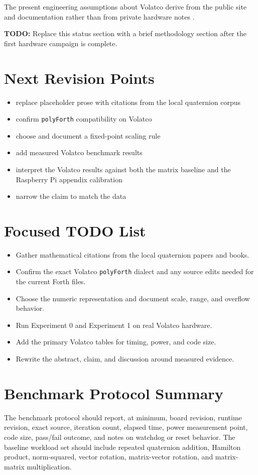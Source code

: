 \documentclass[11pt]{article}
\newcommand{\todoitem}[1]{%
  \par\noindent\textbf{TODO:} #1\par
}
\begin{document}
The present engineering assumptions about Volatco derive from the public site
and documentation rather than from private hardware notes
\cite{volatco-site,volatco-docs}.

\todoitem{Replace this status section with a brief methodology section after the
first hardware campaign is complete.}

\section{Next Revision Points}

\begin{itemize}
\item replace placeholder prose with citations from the local quaternion corpus
\item confirm \texttt{polyForth} compatibility on Volatco
\item choose and document a fixed-point scaling rule
\item add measured Volatco benchmark results
\item interpret the Volatco results against both the matrix baseline and the
Raspberry Pi appendix calibration
\item narrow the claim to match the data
\end{itemize}

\section{Focused TODO List}

\begin{itemize}
\item Gather mathematical citations from the local quaternion papers and books.
\item Confirm the exact Volatco \texttt{polyForth} dialect and any source edits
needed for the current Forth files.
\item Choose the numeric representation and document scale, range, and overflow
behavior.
\item Run Experiment 0 and Experiment 1 on real Volatco hardware.
\item Add the primary Volatco tables for timing, power, and code size.
\item Rewrite the abstract, claim, and discussion around measured evidence.
\end{itemize}




\appendix
\section{Benchmark Protocol Summary}

The benchmark protocol should report, at minimum, board revision, runtime
revision, exact source, iteration count, elapsed time, power measurement point,
code size, pass/fail outcome, and notes on watchdog or reset behavior. The
baseline workload set should include repeated quaternion addition, Hamilton
product, norm-squared, vector rotation, matrix-vector rotation, and
matrix-matrix multiplication.
\end{document}
